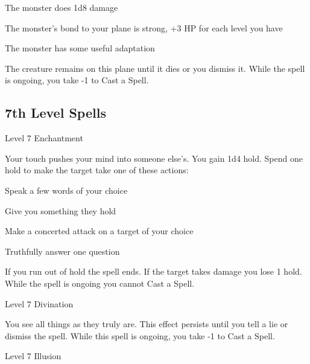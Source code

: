          
\item The monster does 1d8 damage

         
\item The monster's bond to your plane is strong, +3 HP for each level you have

         
\item The monster has some useful adaptation

       
\stopitemize
       

The creature remains on this plane until it dies or you dismiss it. While the spell is ongoing, you take -1 to Cast a Spell.

     

     

       
\subsection{7th Level Spells}     
       
\startSpellName
          	Level 7	Enchantment
\stopSpellName
       

Your touch pushes your mind into someone else's. You gain 1d4 hold. Spend one hold to make the target take one of these actions:

       
\startitemize[1,packed]
         
\item Speak a few words of your choice

         
\item Give you something they hold

         
\item Make a concerted attack on a target of your choice

         
\item Truthfully answer one question

       
\stopitemize
       

If you run out of hold the spell ends. If the target takes damage you lose 1 hold. While the spell is ongoing you cannot Cast a Spell.

       
\startSpellName
          	Level 7	Divination
\stopSpellName
       

You see all things as they truly are. This effect persists until you tell a lie or dismiss the spell. While this spell is ongoing, you take -1 to Cast a Spell.

       
\startSpellName
          	Level 7	Illusion
\stopSpellName
       

